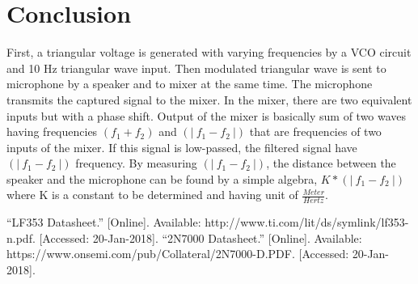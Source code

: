 \documentclass[paper]{IEEEtran}
\begin{document}
\vfill

\section{Conclusion}

	First, a triangular voltage is generated with varying frequencies by a VCO circuit and 10 Hz triangular wave input. Then modulated triangular wave is sent to microphone by a speaker and to mixer at the same time. The microphone transmits the captured signal to the mixer. In the mixer, there are two equivalent inputs but with a phase shift. Output of the mixer is basically sum of two waves having frequencies $ (f_1+f_2)$ and $(|~f_1 -f_2~|) $ that are frequencies of two inputs of the mixer. If this signal is low-passed, the filtered signal have $(|~f_1 -f_2~|) $ frequency. By measuring $(|~f_1 -f_2~|) $, the distance between the speaker and the microphone can be found by a simple algebra, $K*(|~f_1 -f_2~|) $ where K is a constant to be determined and having unit of $\frac{Meter}{Hertz} $.

 


\begin{thebibliography}{00}
 “LF353 Datasheet.” [Online]. Available: http://www.ti.com/lit/ds/symlink/lf353-n.pdf. [Accessed: 20-Jan-2018].
 “2N7000 Datasheet.” [Online]. Available: https://www.onsemi.com/pub/Collateral/2N7000-D.PDF. [Accessed: 20-Jan-2018].
\end{thebibliography}
\end{document}
